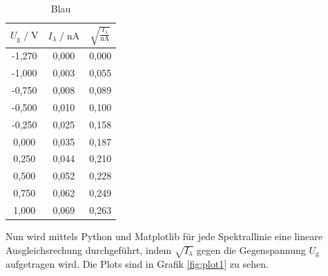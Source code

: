\begin{table}
    \centering
    \caption{Blau}
    \label{tab:blau}
    \begin{tabular}{c c c}
    \toprule
    $ U_\text{g} \;/\; \si{\volt} $ & $I_\lambda \;/\; \si{\nano\ampere}$ &
    $ \sqrt{\frac{I_\lambda}{\si{\nano\ampere}}}$\\
    \midrule 
      -1,270 & 0,000 & 0,000\\
      -1,000 & 0,003 & 0,055\\
      -0,750 & 0,008 & 0,089\\
      -0,500 & 0,010 & 0,100\\
      -0,250 & 0,025 & 0,158\\
       0,000 & 0,035 & 0,187\\
       0,250 & 0,044 & 0,210\\
       0,500 & 0,052 & 0,228\\
       0,750 & 0,062 & 0,249\\
       1,000 & 0,069 & 0,263\\ 
    \bottomrule
    \end{tabular}
\end{table}


Nun wird mittels Python und Matplotlib für jede Spektrallinie eine lineare Ausgleichsrechung durchgeführt, indem 
$\sqrt{I_\lambda}$ gegen die Gegenspannung $U_\text{g}$ aufgetragen wird. Die Plots sind in Grafik \ref{fig:plot1} zu sehen.

